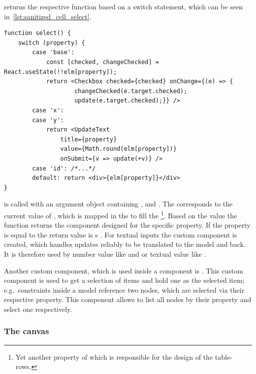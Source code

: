  returns the respective function based on a switch statement, which can be seen in~\ref{lst:sanitized_cell_select}.

\begin{lstlisting}[label={lst:sanitized_cell_select}, caption={Shortened version of \code{select} function inside of the \code{SanitizedCell} function of the \code{Node} component.}]
function select() {
    switch (property) {
        case 'base':
            const [checked, changeChecked] = React.useState(!!elm[property]);
            return <Checkbox checked={checked} onChange={(e) => {
                    changeChecked(e.target.checked);
                    update(e.target.checked);}} />
        case 'x':
        case 'y':
            return <UpdateText
                title={property}
                value={Math.round(elm[property])}
                onSubmit={v => update(+v)} />
        case 'id': /*...*/
        default: return <div>{elm[property]}</div>
}
\end{lstlisting}

 is called with an argument object containing ,  and .
The  corresponds to the current value of , which is mapped in the  to fill the \footnote{Yet another property of  which is responsible for the design of the table-rows.}.
Based on the  value the  function returns the component designed for the specific property.
If the property is equal to  the return value is s .
For textual inputs the custom component  is created, which handles updates reliably to be translated to the  model and back.
It is therefore used by number value like  and  or textual value like .

Another custom component, which is used inside a  component is .
This custom component is used to get a selection of items and hold one as the selected item; e.g.\ constraints inside a  model reference two nodes, which are selected via their respective  property.
This component allows to list all nodes by their  property and select one respectively.

\subsubsection{The canvas}

